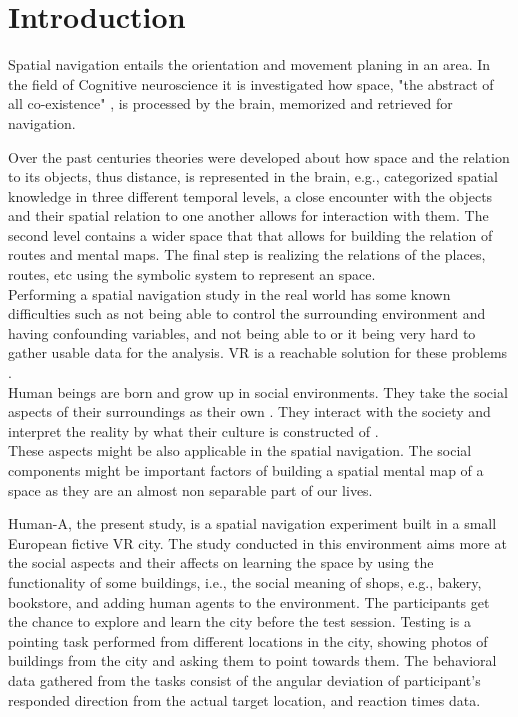 \chapter{Introduction}

Spatial navigation entails the orientation and movement planing in an area. In the field of Cognitive neuroscience it is investigated how space, "the abstract of all co-existence" \autocite{spencer1989}, is processed by the brain, memorized and retrieved for navigation. 

Over the past centuries theories were developed about how space and the relation to its objects, thus distance, is represented in the brain, e.g., \textcite{cassirer1955philosophy} categorized spatial knowledge in three different temporal levels, a close encounter with the objects and their spatial relation to one another allows for interaction with them. The second level contains a wider space that that allows for building the relation of routes and mental maps. The final step is realizing the relations of the places, routes, etc using the symbolic system to represent an space. \\


Performing a spatial navigation study in the real world has some known difficulties such as not being able to control the surrounding environment and having confounding variables, and not being able to or it being very hard to gather usable data for the analysis. VR is a reachable solution for these problems \textcite{10.1242/jeb.187252}. \\

Human beings are born and grow up in social environments. They take the social aspects of their surroundings as their own \autocite{berger1967luckman}. They interact with the society and interpret the reality by what their culture is constructed of \autocite{SIEGEL19759}. \\

These aspects might be also applicable in the spatial navigation. The social components might be important factors of building a spatial mental map of a space as they are an almost non separable part of our lives. 

Human-A, the present study, is a spatial navigation experiment built in a small European fictive VR city. The study conducted in this environment aims more at the social aspects and their affects on learning the space by using the functionality of some buildings, i.e., the social meaning of shops, e.g., bakery, bookstore, and adding human agents to the environment. The participants get the chance to explore and learn the city before the test session. Testing is a pointing task performed from different locations in the city, showing photos of buildings from the city and asking them to point towards them. The behavioral data gathered from the tasks consist of the angular deviation of participant's responded direction from the actual target location, and reaction times data.\\

